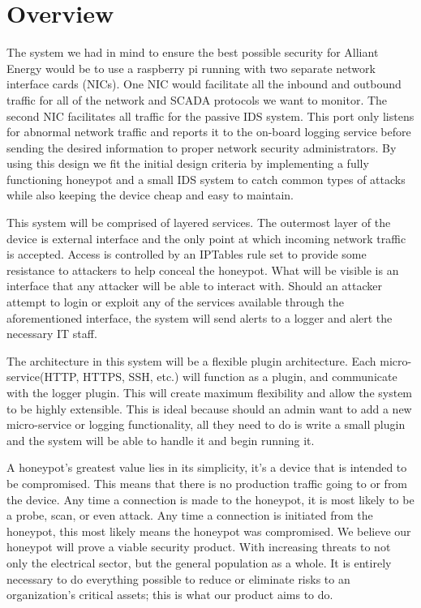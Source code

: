 \section{Overview}
The system we had in mind to ensure the best possible security for Alliant Energy would be to use a raspberry pi running with two separate network interface cards (NICs). One NIC would facilitate all the inbound and outbound traffic for all of the network and SCADA protocols we want to monitor. The second NIC facilitates all traffic for the passive IDS system. This port only listens for abnormal network traffic and reports it to the on-board logging service before sending the desired information to proper network security administrators. By using this design we fit the initial design criteria by implementing a fully functioning honeypot and a small IDS system to catch common types of attacks while also keeping the device cheap and easy to maintain.

This system will be comprised of layered services. The outermost layer of the device is external interface and the only point at which incoming network traffic is accepted. Access is controlled by an IPTables rule set to provide some resistance to attackers to help conceal the honeypot. What will be visible is an interface that any attacker will be able to interact with. Should an attacker attempt to login or exploit any of the services available through the aforementioned interface, the system will send alerts to a logger and alert the necessary IT staff.

The architecture in this system will be a flexible plugin architecture. Each micro-service(HTTP, HTTPS, SSH, etc.) will function as a plugin, and communicate with the logger plugin. This will create maximum flexibility and allow the system to be highly extensible. This is ideal because should an admin want to add a new micro-service or logging functionality, all they need to do is write a small plugin and the system will be able to handle it and begin running it.

A honeypot's greatest value lies in its simplicity, it's a device that is intended to be compromised. This means that there is no production traffic going to or from the device. Any time a connection is made to the honeypot, it is most likely to be a probe, scan, or even attack. Any time a connection is initiated from the honeypot, this most likely means the honeypot was compromised. We believe our honeypot will prove a viable security product. With increasing threats to not only the electrical sector, but the general population as a whole. It is entirely necessary to do everything possible to reduce or eliminate risks to an organization's critical assets; this is what our product aims to do.
